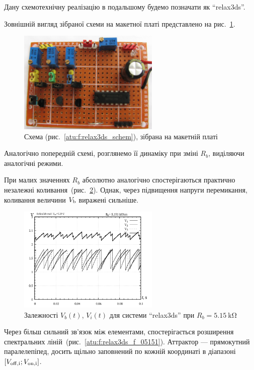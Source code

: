 Дану схемотехнічну реалізацію в подальшому будемо позначати як ``relax3ds''.

Зовнішній вигляд зібраної схеми на макетної платі
представлено на рис.~\ref{atu:f:relax3ds_board}.

\begin{figure}[htb!]
  \centerline{\includegraphics[width=0.6\textwidth]{p/relax3ds_board.jpg} }
\caption{Схема (рис.~\ref{atu:f:relax3ds_schem}), зібрана на макетній платі}
\label{atu:f:relax3ds_board}
\end{figure}

Аналогічно попередній схемі, розглянемо її динаміку при зміні
$R_b$, виділяючи аналогічні режими.

При малих значеннях
$R_b$ абсолютно аналогічно спостерігаються практично незалежні
коливання~(рис.~\ref{atu:f:relax3ds_t_05151}). Однак, через підвищення напруги
перемикання, коливання величини
$V _\mathrm{b} $ виражені сильніше.

\begin{figure}[htb!]
  \centerline{\includegraphics[width=0.6\textwidth]{p/relax3ds_t_005151.png} }
\caption{Залежності $V_b(t)$, $V_i(t)$ для системи ``relax3ds'' при $R_b = \SI{5.15}{\kilo \ohm} $}
  \label{atu:f:relax3ds_t_05151}
\end{figure}


Через більш сильний зв'язок між елементами, спостерігається
розширення спектральних ліній~(рис.~\ref{atu:f:relax3ds_f_05151}). Аттрактор
--- прямокутний паралелепіпед, досить щільно заповнений по кожній
координаті в діапазоні
$[V _\mathrm{off, i}; V _\mathrm{on, i}] $.



